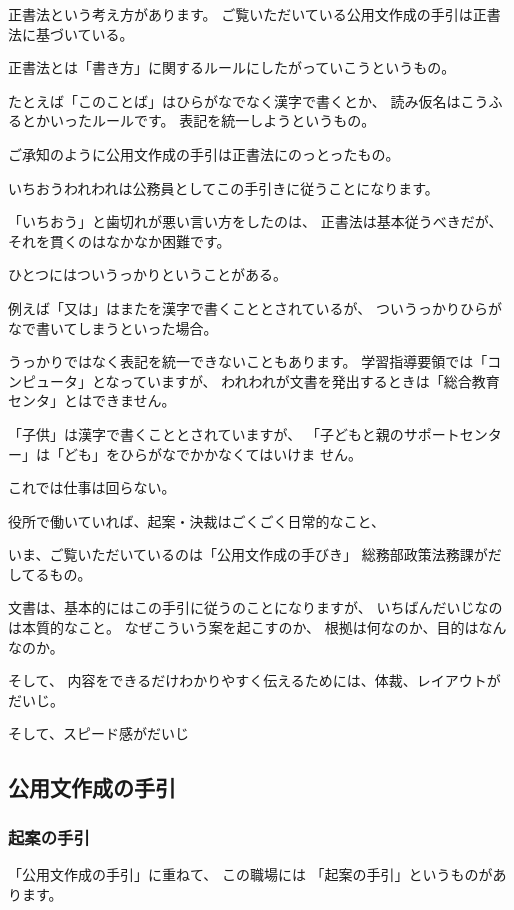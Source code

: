 \documentclass[uplatex,jis2004,dvipdfmx,12pt]{jsarticle}
\begin{document}
正書法という考え方があります。
ご覧いただいている公用文作成の手引は正書法に基づいている。

正書法とは「書き方」に関するルールにしたがっていこうというもの。

たとえば「このことば」はひらがなでなく漢字で書くとか、
読み仮名はこうふるとかいったルールです。
表記を統一しようというもの。

ご承知のように公用文作成の手引は正書法にのっとったもの。

いちおうわれわれは公務員としてこの手引きに従うことになります。

「いちおう」と歯切れが悪い言い方をしたのは、
正書法は基本従うべきだが、それを貫くのはなかなか困難です。

ひとつにはついうっかりということがある。

例えば「又は」はまたを漢字で書くこととされているが、
ついうっかりひらがなで書いてしまうといった場合。

うっかりではなく表記を統一できないこともあります。
学習指導要領では「コンピュータ」となっていますが、
われわれが文書を発出するときは「総合教育センタ」とはできません。

「子供」は漢字で書くこととされていますが、
「子どもと親のサポートセンター」は「ども」をひらがなでかかなくてはいけま
せん。

これでは仕事は回らない。

役所で働いていれば、起案・決裁はごくごく日常的なこと、

いま、ご覧いただいているのは「公用文作成の手びき」
総務部政策法務課がだしてるもの。


文書は、基本的にはこの手引に従うのことになりますが、
いちばんだいじなのは本質的なこと。
なぜこういう案を起こすのか、
根拠は何なのか、目的はなんなのか。

そして、
内容をできるだけわかりやすく伝えるためには、体裁、レイアウトがだいじ。

そして、スピード感がだいじ
\fi



\subsection{公用文作成の手引}

\subsubsection{起案の手引}
「公用文作成の手引」に重ねて、
この職場には
「起案の手引」というものがあります。
\end{document}
